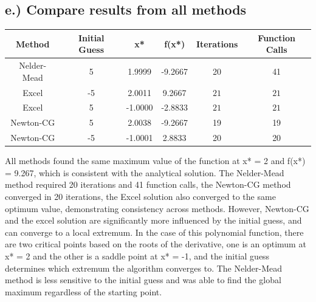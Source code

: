 \documentclass{article}%
\begin{document}
%
\subsection*{e.) Compare results from all methods}%
\label{subsec:e.)Compareresultsfromallmethods}%
\begin{table}[H]%
\centering%
\begin{tabular}{cccccc}%
\hline%
Method&Initial Guess&x*&f(x*)&Iterations&Function Calls\\%
\hline%
Nelder{-}Mead&5&1.9999&{-}9.2667&20&41\\%
\hline%
Excel&{-}5&2.0011&9.2667&$21$&$21$\\%
\hline%
Excel&5&{-}1.0000&{-}2.8833&$21$&$21$\\%
\hline%
Newton{-}CG&5&2.0038&{-}9.2667&19&19\\%
\hline%
Newton{-}CG&{-}5&{-}1.0001&2.8833&20&20\\%
\hline%
\end{tabular}%
\end{table}%
All methods found the same maximum value of the function at x* = 2 and f(x*) = 9.267, which is consistent with the analytical solution. The Nelder{-}Mead method required 20 iterations and 41 function calls, the Newton{-}CG method converged in 20 iterations, the Excel solution also converged to the same optimum value, demonstrating consistency across methods. However, Newton{-}CG and the excel solution are significantly more influenced by the initial guess, and can converge to a local extremum. In the case of this polynomial function, there are two critical points based on the roots of the derivative, one is an optimum at x* = 2 and the other is a saddle point at x* = {-}1, and the initial guess determines which extremum the algorithm converges to. The Nelder{-}Mead method is less sensitive to the initial guess and was able to find the global maximum regardless of the starting point.%
\par

%
\end{document}
